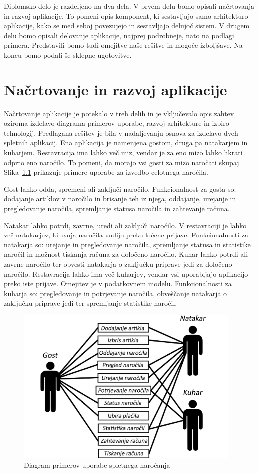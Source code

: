 \documentclass[a4paper, 12pt]{book}
\begin{document}
Diplomsko delo je razdeljeno na dva dela. V prvem delu bomo opisali načrtovanja in razvoj aplikacije. To pomeni opis komponent, ki sestavljajo samo arhitekturo aplikacije, kako se med seboj povezujejo in sestavljajo delujoč sistem. V drugem delu bomo opisali delovanje aplikacije, najprej podrobneje, nato na podlagi primera. Predstavili bomo tudi omejitve naše rešitve in mogoče izboljšave. Na koncu bomo podali še sklepne ugotovitve. 

\chapter{Načrtovanje in razvoj aplikacije}

Načrtovanje aplikacije je potekalo v treh delih in je vključevalo opis zahtev oziroma izdelavo diagrama primerov uporabe, razvoj arhitekture in izbiro tehnologij. Predlagana rešitev je bila v nadaljevanju osnova za izdelavo dveh spletnih aplikacij. Ena aplikacija je namenjena gostom, druga pa natakarjem in kuharjem. Restavracija ima lahko več miz, vendar je za eno mizo lahko hkrati odprto eno naročilo. To pomeni, da morajo vsi gosti za mizo naročati skupaj. Slika~\ref{FunkVloge} prikazuje primere uporabe za izvedbo celotnega naročila. 

Gost lahko odda, spremeni ali zaključi naročilo. Funkcionalnost za gosta so: dodajanje artiklov v naročilo in brisanje teh iz njega, oddajanje, urejanje in pregledovanje naročila, spremljanje statusa naročila in zahtevanje računa. 

Natakar lahko potrdi, zavrne, uredi ali zaključi naročilo. V restavraciji je lahko več natakarjev, ki svoja naročila vodijo preko ločene prijave. Funkcionalnosti za natakarja so: urejanje in pregledovanje naročila, spremljanje statusa in statistike naročil in možnost tiskanja računa za določeno naročilo. Kuhar lahko potrdi ali zavrne naročilo ter obvesti natakarja o zaključku priprave jedi za določeno naročilo. Restavracija lahko ima več kuharjev, vendar vsi uporabljajo aplikacijo preko iste prijave. Omejitev je v podatkovnem modelu. Funkcionalnosti za kuharja so: pregledovanje in potrjevanje naročila, obveščanje natakarja o zaključku priprave jedi ter spremljanje statistike naročil. 

\begin{figure}[!htb]
\centering
\includegraphics[width=10.8cm]{Skica2.png}
\caption{Diagram primerov uporabe spletnega naročanja}
\label{FunkVloge}
\end{figure}
\end{document}

